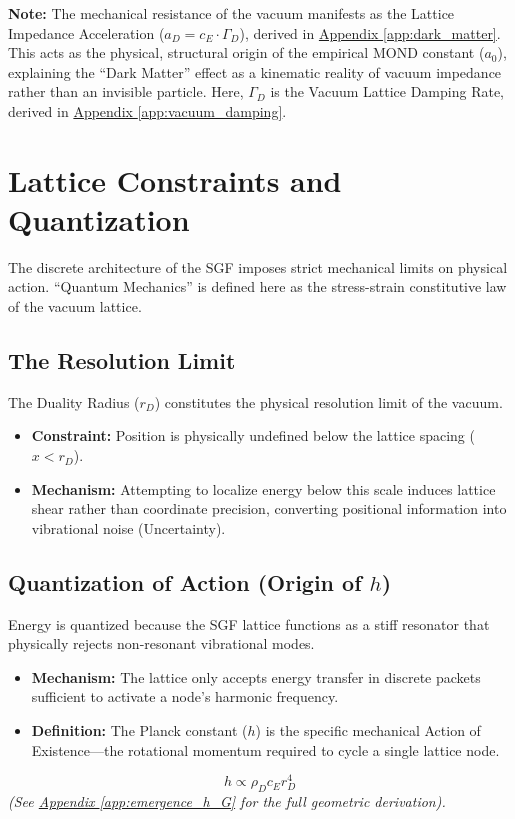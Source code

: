\begin{table}[H]
\vspace{0.2cm}
{\small \textbf{Note:} The mechanical resistance of the vacuum manifests as the Lattice Impedance Acceleration ($a_D = c_E \cdot \Gamma_D$), derived in \hyperref[app:dark_matter]{Appendix \ref*{app:dark_matter}}. This acts as the physical, structural origin of the empirical MOND constant ($a_0$), explaining the ``Dark Matter'' effect as a kinematic reality of vacuum impedance rather than an invisible particle. Here, $\Gamma_D$ is the Vacuum Lattice Damping Rate, derived in \hyperref[app:vacuum_damping]{Appendix \ref*{app:vacuum_damping}}.}
\end{table}

\chapter{Lattice Constraints and Quantization}
The discrete architecture of the SGF imposes strict mechanical limits on physical action. ``Quantum Mechanics'' is defined here as the stress-strain constitutive law of the vacuum lattice.

\section{The Resolution Limit}
The Duality Radius ($r_D$) constitutes the physical resolution limit of the vacuum.
\begin{itemize}
    \item \textbf{Constraint:} Position is physically undefined below the lattice spacing ($x < r_D$).
    \item \textbf{Mechanism:} Attempting to localize energy below this scale induces lattice shear rather than coordinate precision, converting positional information into vibrational noise (Uncertainty).
\end{itemize}

\section{Quantization of Action (Origin of $h$)}
Energy is quantized because the SGF lattice functions as a stiff resonator that physically rejects non-resonant vibrational modes.
\begin{itemize}
    \item \textbf{Mechanism:} The lattice only accepts energy transfer in discrete packets sufficient to activate a node's harmonic frequency.
    \item \textbf{Definition:} The Planck constant ($h$) is the specific mechanical Action of Existence---the rotational momentum required to cycle a single lattice node.
\end{itemize}
\begin{equation}
h \propto \rho_D c_E r_D^4
\end{equation}
\textit{(See \hyperref[app:emergence_h_G]{Appendix \ref*{app:emergence_h_G}} for the full geometric derivation).}

